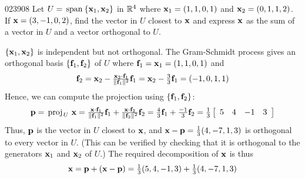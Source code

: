 \begin{example}{}{023908}
Let $U = \thinspace\operatorname{span\medspace}\{\textbf{x}_{1}, \textbf{x}_{2}\}$ in $\mathbb{R}^4$ where $\textbf{x}_{1} = (1, 1, 0, 1)$ and $\textbf{x}_{2} = (0, 1, 1, 2)$. If $\textbf{x} = (3, -1, 0, 2)$, find the vector in $U$ closest to $\textbf{x}$ and express $\textbf{x}$ as the sum of a vector in $U$ and a vector orthogonal to $U$.

\begin{solution}
  $\{\textbf{x}_{1}, \textbf{x}_{2}\}$ is independent but not orthogonal. The Gram-Schmidt process gives an orthogonal basis $\{\textbf{f}_{1}, \textbf{f}_{2}\}$ of $U$ where $\textbf{f}_{1} = \textbf{x}_{1} = (1, 1, 0, 1)$ and
\begin{equation*}
\textbf{f}_{2} =\textbf{x}_{2} - \tfrac{\textbf{x}_{2} \cdot \textbf{f}_{1}}{\| \textbf{f}_{1} \|^2}\textbf{f}_{1} = \textbf{x}_{2} - \tfrac{3}{3}\textbf{f}_{1} = (-1, 0, 1, 1)
\end{equation*}
Hence, we can compute the projection using $\{\textbf{f}_{1}, \textbf{f}_{2}\}$:
\begin{equation*}
\textbf{p} = \thinspace\operatorname{proj\medspace}_{\!U}\,{\textbf{x}} =\tfrac{\textbf{x} \cdot \textbf{f}_{1}}{\| \textbf{f}_{1} \|^2}\textbf{f}_{1} + \tfrac{\textbf{x} \cdot \textbf{f}_{2}}{\| \textbf{f}_{2} \|^2}\textbf{f}_{2} = \tfrac{4}{3}\textbf{f}_{1} + \tfrac{-1}{3}\textbf{f}_{2} = \tfrac{1}{3}\left[ \begin{array}{rrrr}
5 & 4 & -1 & 3
\end{array}\right]
\end{equation*}
Thus, $\textbf{p}$ is the vector in $U$ closest to $\textbf{x}$, and $\textbf{x} - \textbf{p} = \tfrac{1}{3}(4, -7, 1, 3)$ is orthogonal to every vector in $U$. (This can be verified by checking that it is orthogonal to the generators $\textbf{x}_{1}$ and $\textbf{x}_{2}$ of $U$.) The required decomposition of $\textbf{x}$ is thus
\begin{equation*}
\textbf{x} = \textbf{p} + (\textbf{x} - \textbf{p}) = \tfrac{1}{3}(5, 4, -1, 3) + \tfrac{1}{3}(4, -7, 1, 3)
\end{equation*}
\end{solution}
\end{example}

